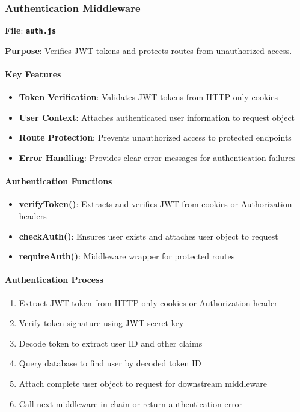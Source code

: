 \documentclass[12pt,a4paper]{article}
\newcommand{\file}[1]{\textbf{\texttt{#1}}}
\begin{document}
\subsubsection{Authentication Middleware}
\label{subsubsec:auth-middleware}

\textbf{File}: \file{auth.js}

\textbf{Purpose}: Verifies JWT tokens and protects routes from unauthorized access.

\paragraph{Key Features}
\begin{itemize}
\item \textbf{Token Verification}: Validates JWT tokens from HTTP-only cookies
\item \textbf{User Context}: Attaches authenticated user information to request object
\item \textbf{Route Protection}: Prevents unauthorized access to protected endpoints
\item \textbf{Error Handling}: Provides clear error messages for authentication failures
\end{itemize}

\paragraph{Authentication Functions}
\begin{itemize}
\item \textbf{verifyToken()}: Extracts and verifies JWT from cookies or Authorization headers
\item \textbf{checkAuth()}: Ensures user exists and attaches user object to request
\item \textbf{requireAuth()}: Middleware wrapper for protected routes
\end{itemize}

\paragraph{Authentication Process}
\begin{enumerate}
\item Extract JWT token from HTTP-only cookies or Authorization header
\item Verify token signature using JWT secret key
\item Decode token to extract user ID and other claims
\item Query database to find user by decoded token ID
\item Attach complete user object to request for downstream middleware
\item Call next middleware in chain or return authentication error
\end{enumerate}
\end{document}
